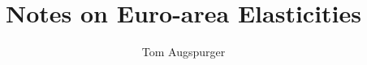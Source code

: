 \documentclass[12pt,a4paper]{article}                      %
\begin{document}


\title{Notes on Euro-area Elasticities}
\author{Tom Augspurger}                               %










\end{document}

